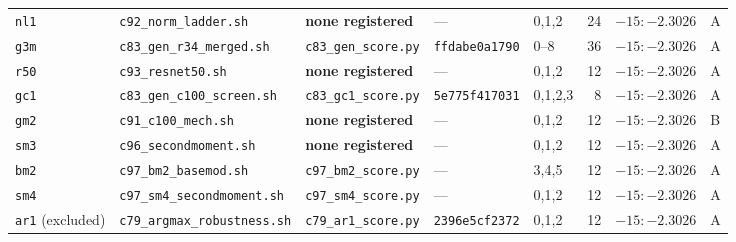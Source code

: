 \documentclass[10pt,letterpaper]{article}
\newcommand{\arm}[1]{\texttt{#1}}
\begin{document}
\begin{table}[htbp]
{\begin{tabular}{@{}lllllrll@{}}
\arm{nl1} & \texttt{c92\_norm\_ladder.sh} & \textbf{none registered} & --- & 0,1,2 & 24 &
  $-15{:}{-}2.3026$ & A \\
\arm{g3m} & \texttt{c83\_gen\_r34\_merged.sh} & \texttt{c83\_gen\_score.py} &
  \texttt{ffdabe0a1790} & 0--8 & 36 & $-15{:}{-}2.3026$ & A \\
\arm{r50} & \texttt{c93\_resnet50.sh} & \textbf{none registered} & --- & 0,1,2 & 12 &
  $-15{:}{-}2.3026$ & A \\
\arm{gc1} & \texttt{c83\_gen\_c100\_screen.sh} & \texttt{c83\_gc1\_score.py} &
  \texttt{5e775f417031} & 0,1,2,3 & 8 & $-15{:}{-}2.3026$ & A \\
\arm{gm2} & \texttt{c91\_c100\_mech.sh} & \textbf{none registered} & --- & 0,1,2 & 12 &
  $-15{:}{-}2.3026$ & B \\
\arm{sm3} & \texttt{c96\_secondmoment.sh} & \textbf{none registered} & --- &
  0,1,2 & 12 & $-15{:}{-}2.3026$ & A \\
\arm{bm2} & \texttt{c97\_bm2\_basemod.sh} & \texttt{c97\_bm2\_score.py} & --- &
  3,4,5 & 12 & $-15{:}{-}2.3026$ & A \\
\arm{sm4} & \texttt{c97\_sm4\_secondmoment.sh} & \texttt{c97\_sm4\_score.py} & --- &
  0,1,2 & 12 & $-15{:}{-}2.3026$ & A \\
\arm{ar1} (excluded) & \texttt{c79\_argmax\_robustness.sh} & \texttt{c79\_ar1\_score.py} &
  \texttt{2396e5cf2372} & 0,1,2 & 12 & $-15{:}{-}2.3026$ & A \\
\bottomrule
\end{tabular}}
\end{table}
\end{document}
